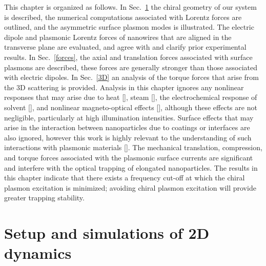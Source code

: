 This chapter is organized as follows. In Sec.~\ref{intro} the chiral geometry of our system is described, the numerical computations associated with Lorentz forces are outlined, and the asymmetric surface plasmon modes is illustrated. The electric dipole and plasmonic Lorentz forces of nanowires that are aligned in the transverse plane are evaluated, and agree with and clarify prior experimental results. In Sec.~\ref{forces}, the axial and translation forces associated with surface plasmons are described, these forces are generally stronger than those associated with electric dipoles.  In Sec.~\ref{3D} an analysis of the torque forces that arise from the 3D scattering is provided.  Analysis in this chapter ignores any nonlinear responses that may arise due to heat [\cite{Shvedov2010}], steam [\cite{Saija2009, Fang2013}], the electrochemical response of solvent [\cite{Arcenegui2013}], and nonlinear magneto-optical effects [\cite{Singh, Moocarme2014}], although these effects are not negligible, particularly at high illumination intensities.  Surface effects that may arise in the interaction between nanoparticles due to coatings or interfaces are also ignored, however this work is highly relevant to the understanding of such interactions with plasmonic materials [\cite{Bonin}].  The mechanical translation, compression, and torque forces associated with the plasmonic surface currents are significant and interfere with the optical trapping of elongated nanoparticles. The results in this chapter indicate that there exists a frequency cut-off at which the chiral plasmon excitation is minimized; avoiding chiral plasmon excitation will provide greater trapping stability.

\section{Setup and simulations of 2D dynamics}\label{intro}

